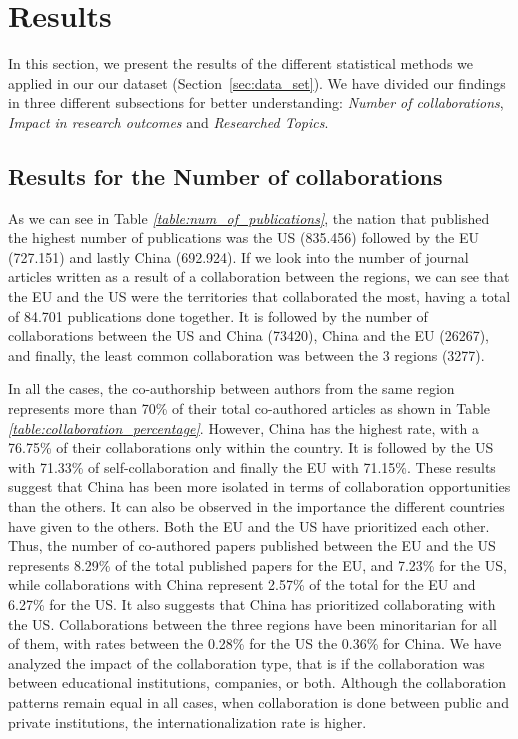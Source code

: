 \section{Results}
\label{sec:results}

In this section, we present the results of the different statistical methods we applied in our our dataset (Section~\ref{sec:data_set}). We have divided our findings in three different subsections for better understanding: \textit{Number of collaborations}, \textit{Impact in research outcomes} and \textit{Researched Topics}.

\subsection{Results for the Number of collaborations}

As we can see in Table \textit{\ref{table:num_of_publications}}, the nation that published the highest number of publications was the US (835.456) followed by the EU (727.151) and lastly China (692.924). If we look into the number of journal articles written as a result of a collaboration between the regions, we can see that the EU and the US were the territories that collaborated the most, having a total of 84.701 publications done together. It is followed by the number of collaborations between the US and China (73420), China and the EU (26267), and finally, the least common collaboration was between the 3 regions (3277).



In all the cases, the co-authorship between authors from the same region represents more than 70\% of their total co-authored articles as shown in Table \textit{\ref{table:collaboration_percentage}}. However, China has the highest rate, with a 76.75\% of their collaborations only within the country. It is followed by the US with 71.33\% of self-collaboration and finally the EU with 71.15\%. These results suggest that China has been more isolated in terms of collaboration opportunities than the others. It can also be observed in the importance the different countries have given to the others. Both the EU and the US have prioritized each other. Thus, the number of co-authored papers published between the EU and the US represents 8.29\% of the total published papers for the EU, and 7.23\% for the US, while collaborations with China represent 2.57\% of the total for the EU and 6.27\% for the US. It also suggests that China has prioritized collaborating with the US. Collaborations between the three regions have been minoritarian for all of them, with rates between the 0.28\% for the US the 0.36\% for China. We have analyzed the impact of the collaboration type, that is if the collaboration was between educational institutions, companies, or both. Although the collaboration patterns remain equal in all cases, when collaboration is done between public and private institutions, the internationalization rate is higher. 

